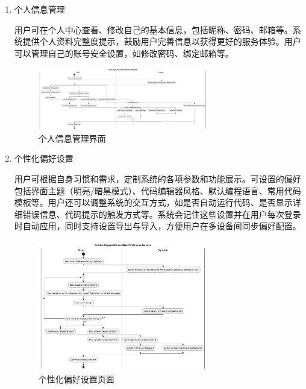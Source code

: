 \documentclass[
    report,     %
    oneside,    %
    UTF8,       %
    zihao=-4    %
]{config} %
\begin{document}
\begin{enumerate}[label=(\arabic*)]
    \item 个人信息管理
    
    用户可在个人中心查看、修改自己的基本信息，包括昵称、密码、邮箱等。系统提供个人资料完整度提示，鼓励用户完善信息以获得更好的服务体验。用户可以管理自己的账号安全设置，如修改密码、绑定邮箱等。%
    \begin{figure}[H]
        \centering
        \includegraphics[width=0.7\textwidth]{UML/Activity/Personal-Information-Management.png}
        \caption{个人信息管理界面}
        \label{fig:PersonalInfoManagement}
    \end{figure}
    
    \item 个性化偏好设置
    
    用户可根据自身习惯和需求，定制系统的各项参数和功能展示。可设置的偏好包括界面主题（明亮/暗黑模式）、代码编辑器风格、默认编程语言、常用代码模板等。用户还可以调整系统的交互方式，如是否自动运行代码、是否显示详细错误信息、代码提示的触发方式等。系统会记住这些设置并在用户每次登录时自动应用，同时支持设置导出与导入，方便用户在多设备间同步偏好配置。
    \begin{figure}[H]
        \centering
        \includegraphics[width=0.7\textwidth]{UML/Activity/Personalized-Preference-Settings.png}
        \caption{个性化偏好设置页面}
        \label{fig:PersonalizedPreferences}
    \end{figure}
\end{enumerate}
\end{document}
